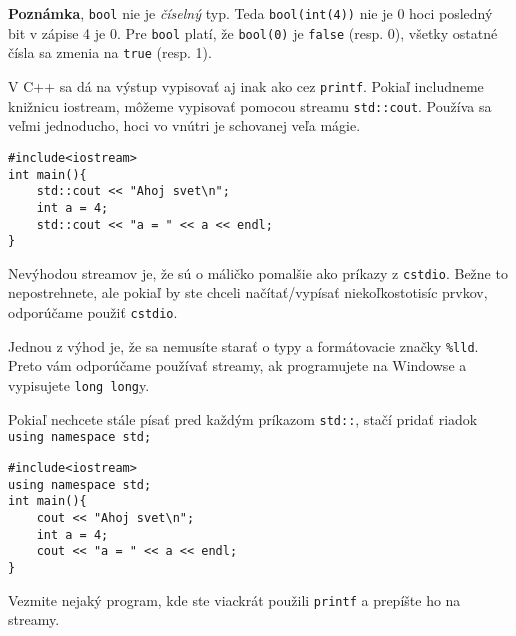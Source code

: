 \textbf{Poznámka}, \verb!bool! nie je \textit{číselný} typ. Teda \verb!bool(int(4))! nie
je 0 hoci posledný bit v zápise 4 je 0.  Pre \verb!bool! platí, že
\verb!bool(0)! je \verb!false! (resp. 0), všetky ostatné čísla sa zmenia na
\verb!true! (resp. 1).



V C++ sa dá na výstup vypisovať aj inak ako cez \verb!printf!. Pokiaľ
includneme knižnicu iostream, môžeme vypisovať pomocou streamu
\verb!std::cout!. Používa sa veľmi jednoducho, hoci vo vnútri je schovanej veľa
mágie.

\begin{lstlisting}
#include<iostream>
int main(){
    std::cout << "Ahoj svet\n";
    int a = 4;
    std::cout << "a = " << a << endl;
}
\end{lstlisting}

Nevýhodou streamov je, že sú o máličko pomalšie ako príkazy z \verb!cstdio!. Bežne
to nepostrehnete, ale pokiaľ by ste chceli načítať/vypísať niekoľkostotisíc
prvkov, odporúčame použiť \verb!cstdio!.

Jednou z výhod je, že sa nemusíte starať o typy a formátovacie značky
\verb"%lld". Preto vám odporúčame používať streamy, ak programujete na Windowse
a vypisujete \verb!long long!y.

Pokiaľ nechcete stále písať pred každým príkazom \verb!std::!, stačí pridať
riadok \verb!using namespace std;!

\begin{lstlisting}
#include<iostream>
using namespace std;
int main(){
    cout << "Ahoj svet\n";
    int a = 4;
    cout << "a = " << a << endl;
}
\end{lstlisting}

\cvicenie Vezmite nejaký program, kde ste viackrát použili \verb!printf! a
prepíšte ho na streamy.
\fakeriesenie




